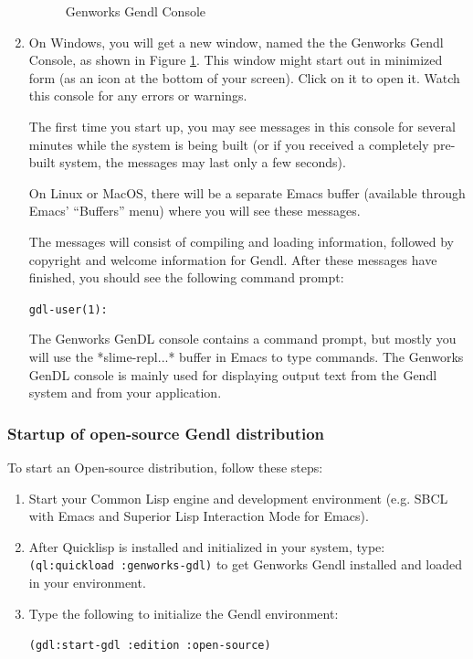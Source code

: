 \documentclass [11pt]{book}
\begin{document}
\begin{enumerate}
\begin{figure}
\caption{Genworks Gendl Console}

\label{fig:genworks-gendl-console}

\end{figure}

\item On Windows, you will get a new window, named the the Genworks Gendl Console, as shown in Figure 
\ref{fig:genworks-gendl-console}. This window might start out in minimized form (as an icon at the bottom of your screen). Click on it 
to open it. Watch this console for any errors or warnings. 

The first time you start up, you may see messages in this console for
several minutes while the system is being built (or if you received a
completely pre-built system, the messages may last only a few
seconds).

On Linux or MacOS, there will be a separate Emacs buffer (available
through Emacs' ``Buffers'' menu) where you will see these messages.

The messages will consist of compiling and loading information, followed by copyright and welcome information
for Gendl. After these messages have finished, you should see the following command prompt:

\texttt{gdl-user(1): }

The Genworks GenDL console contains a command prompt, but mostly you will use the *slime-repl...* buffer in Emacs to type commands. The Genworks GenDL console is mainly used for 
displaying output text from the Gendl system and from your application.

\end{enumerate}



\subsubsection{Startup of open-source Gendl distribution}

\label{subsubsec:startupofopen-sourcegendldistribution}

To start an Open-source distribution, follow these steps:

\begin{enumerate}

\item Start your Common Lisp engine and development environment (e.g. SBCL with Emacs and Superior Lisp Interaction Mode for Emacs).

\item After Quicklisp is installed and initialized in your system, type: \texttt{(ql:quickload :genworks-gdl)} to get Genworks Gendl installed and loaded in your environment.

\item Type the following to initialize the Gendl environment:

\texttt{(gdl:start-gdl :edition :open-source)}



\end{enumerate}
\end{document}
